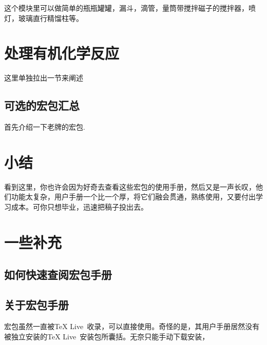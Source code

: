 \documentclass[a4paper,UTF8,zihao = -4]{ctexart} %
\begin{document}
\begin{dispExample}
\pstTubeEssais[etiquette]
\pstTubeEssais[substance = \pstBullesChampagne,glassType=fioleJauge]
\pstTubeEssais[substance = \pstFilaments{red},glassType = flacon]
\pstTubeEssais[substance = \pstBilles,glassType = ballon]
\pstEntonnoir[substance = \pstBULLES{white},glassType = erlen]
\pstEprouvette[niveauLiquide2=100]
\vspace{3ex} %
\pstDosage[glassType = becher,phmetre = true]
\end{dispExample}

这个模块里可以做简单的瓶瓶罐罐，漏斗，滴管，量筒带搅拌磁子的搅拌器，喷灯，玻璃直行精馏柱等。

\begin{dispExample}
\pstChauffageTube[%
  becBunsen,
  glassType=ballon,
  niveauLiquide1=20,
  aspectLiquide1=Diffusion,%
  pince%
]
\pstDistillation
\end{dispExample}

\section{处理有机化学反应}
\label{sec:organic}

这里单独拉出一节来阐述

\subsection{可选的宏包汇总}
\label{sec:OrganSummary}

首先介绍一下老牌的\XyMTeX{}宏包.

\section*{小结}
\label{sec:conclusion}

看到这里，你也许会因为好奇去查看这些宏包的使用手册，然后又是一声长叹，他们功能太复杂，用户手册一个比一个厚，将它们融会贯通，熟练使用，又要付出学习成本。可你只想毕业，迅速把稿子投出去。

\section*{一些补充}
\label{sec:miscellaneous}


\subsection*{如何快速查阅宏包手册}
\label{sec:texdoc}



\subsection*{关于\XyMTeX{}宏包手册} %
\label{sec:xymtexDoc}
\XyMTeX{}宏包虽然一直被\TeX{} Live~收录，可以直接使用。奇怪的是，其用户手册居然没有被独立安装的\TeX{} Live~安装包所囊括。无奈只能手动下载安装，
\end{document}
